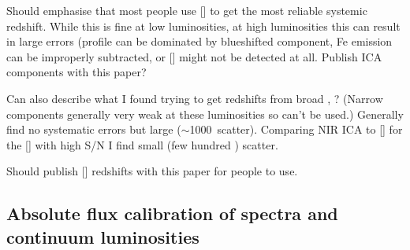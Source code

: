 Should emphasise that most people use [] to get the most reliable systemic redshift. 
While this is fine at low luminosities, at high luminosities this can result in large errors (profile can be dominated by blueshifted component, Fe emission can be improperly subtracted, or [] might not be detected at all. 
Publish ICA components with this paper? 

Can also describe what I found trying to get redshifts from broad \hans, \hbns? (Narrow components generally very weak at these luminosities so can't be used.)
Generally find no systematic errors but large ($\sim$1000\kms\, scatter).
Comparing NIR ICA to [] for the [] with high S/N I find small (few hundred \kms) scatter. 

Should publish [] redshifts with this paper for people to use. 










 




















\subsection{Absolute flux calibration of spectra and continuum luminosities}

